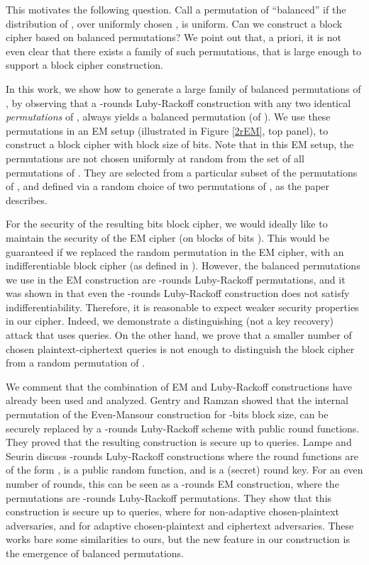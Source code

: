 \documentclass{llncs}
\begin{document}
This motivates the following question. 
Call a permutation  of  ``balanced'' if the distribution of , 
over uniformly chosen , is uniform. Can we construct a block cipher based on balanced permutations?
We point out that, a priori, it is not even clear that there exists a family of such permutations, that is large enough to support a block cipher construction. 

In this work, we show how to generate a large family of balanced permutations of , by observing that a -rounds Luby-Rackoff construction with any two identical \emph{permutations} of , always yields a balanced permutation (of ). We use these permutations in an EM setup 
(illustrated in Figure \ref{2rEM}, top panel), to construct a block cipher with block size of  bits. 
Note that in this EM setup, the permutations  are not 
chosen uniformly at random from the set of all permutations of . They are selected from a particular subset of the permutations of , and defined via a random choice of two 
permutations of , as the paper describes. 

For the security of the resulting  bits block cipher, we would ideally
like to maintain the security of the EM cipher (on blocks of  bits ). This would be guaranteed if we replaced the random permutation in the EM cipher, with an indifferentiable block cipher (as defined in \cite{MRH}). However, the balanced permutations we use in the EM construction are -rounds Luby-Rackoff permutations, and it was shown in \cite{CPS} that even the -rounds Luby-Rackoff construction does not satisfy indifferentiability. Therefore, it is reasonable to expect weaker security properties in our cipher. 
Indeed, we demonstrate a distinguishing  (not a key recovery) 
attack that uses  queries. On the other hand, we prove that a smaller number of chosen plaintext-ciphertext queries is not enough to distinguish the block cipher from a random permutation of . 

We comment that the combination of EM and Luby-Rackoff constructions have already been used and analyzed. 
Gentry and Ramzan \cite{GR} showed that the internal permutation of the Even-Mansour construction for -bits block size, can be securely replaced by a -rounds Luby-Rackoff scheme with public round functions. They proved that the resulting construction is secure up to  queries. 
Lampe and Seurin \cite{LS} discuss -rounds Luby-Rackoff 
constructions where the round functions are of the form ,  is a public random function, and  is a (secret) round key. For an even number of rounds, this can be seen as a 
-rounds EM construction, where the permutations are -rounds 
Luby-Rackoff permutations. 
They show that this construction is secure up to  queries, where  for non-adaptive chosen-plaintext adversaries, and  for adaptive chosen-plaintext and ciphertext adversaries.
These works bare some similarities to ours, but the new feature in our construction is the emergence of balanced permutations. 
\end{document}

